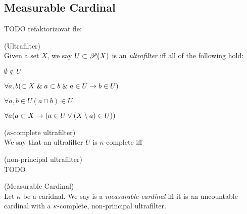 {\color{red}
\begin{comment}
\begin{theorem}\label{th:refl_weakly_compact}
Let $\kappa$ be a~weakly compact cardinal. Then for every stationary set $S \subset \kappa$ there is an uncountable regular cardinal $\lambda < \kappa$ such that the set $S \cap \lambda$ is stationary in $\lambda$.
\end{theorem}
\begin{proof}
TODO %
\end{proof}

\

\end{comment}
}

\subsection{Measurable Cardinal}

TODO refaktorizovat fle:
\begin{definition}{(Ultrafilter)}\\
Given a set $X$, we say $U \subset \mathscr{P} (X)$ is an \emph{ultrafilter} iff all of the following hold:
\bce[(i)]
\item $\emptyset \not\in U$
\item $\forall a, b (\subset X \mathrel{\&} a \subset b \mathrel{\&} a \in U \rightarrow b \in U)$
\item $\forall a, b \in U (a \cap b) \in U$
\item $\forall a (a \subset X \rightarrow (a \in U \lor (X \setminus a) \in U))$
\ece
\end{definition}

\begin{definition}{($\kappa$-complete ultrafilter)}\\
We say that an ultrafilter $U$ is $\kappa$-complete iff
\end{definition}

\begin{definition}{(non-principal ultrafilter)}\\
TODO
\end{definition}

\begin{definition}{(Measurable Cardinal)}\\
Let $\kappa$ be a caridnal. We say is a \emph{measurable cardinal} iff it is an uncountable cardinal with a $\kappa$-complete, non-principal ultrafilter.
\end{definition}

